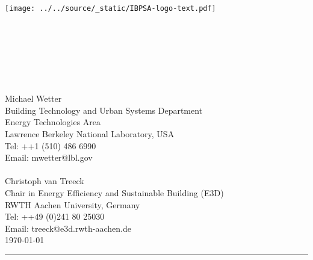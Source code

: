 \begin{titlepage}
\hspace*{12.1cm}\texttt{[image: ../../source/\_static/IBPSA-logo-text.pdf]}~\\
\begin{flushright}
\vspace{-1cm}
\large{~}
\\[5mm]
\hrulefill
\\[5mm]
 \Large{}\\
 \Large{}\\
\Large{}\\[3mm]
\hrulefill
~\\[20mm]
\large{Michael Wetter\\
Building Technology and Urban Systems Department\\
Energy Technologies Area\\
Lawrence Berkeley National Laboratory, USA\\
Tel: ++1 (510) 486 6990\\
Email: mwetter@lbl.gov\\
~\\
Christoph van Treeck\\
Chair in Energy Efficiency and Sustainable Building (E3D)\\
RWTH Aachen University, Germany\\
Tel: ++49 (0)241 80 25030\\
Email: treeck@e3d.rwth-aachen.de}\\[20mm]
\large{\today}
\\[20mm]
\end{flushright}
\hrule
~\\[2mm]
\end{titlepage}
